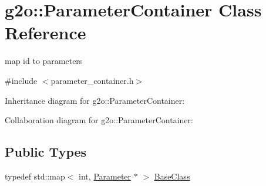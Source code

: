 \hypertarget{classg2o_1_1ParameterContainer}{}\section{g2o\+:\+:Parameter\+Container Class Reference}
\label{classg2o_1_1ParameterContainer}


map id to parameters  




{\ttfamily \#include $<$parameter\+\_\+container.\+h$>$}



Inheritance diagram for g2o\+:\+:Parameter\+Container\+:


Collaboration diagram for g2o\+:\+:Parameter\+Container\+:
\subsection*{Public Types}
\begin{DoxyCompactItemize}
\item 
typedef std\+::map$<$ int, \hyperlink{classg2o_1_1Parameter}{Parameter} $\ast$ $>$ \hyperlink{classg2o_1_1ParameterContainer_a200fdfdce01f7fb5f96e02a8ddf666ac}{Base\+Class}
\end{DoxyCompactItemize}
